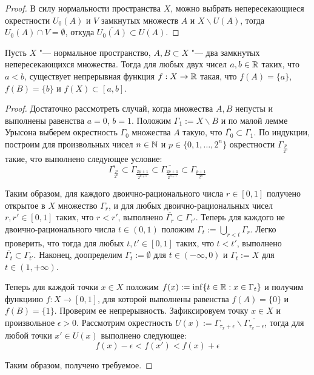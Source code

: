 \begin{proof}
    В силу нормальности пространства $X$, можно выбрать непересекающиеся окрестности $U_0(A)$ и $V$ замкнутых множеств $A$ и $X \backslash U(A)$, тогда $U_0(A) \cap V = \emptyset$, откуда $\overline{U_0(A)} \subset U(A)$.
\end{proof}

\begin{proposition}
    Пусть $X$ "--- нормальное пространство, $A, B \subset X$ "--- два замкнутых  непересекающихся множества. Тогда для любых двух чисел $a, b \in \mathbb{R}$ таких, что $a < b$, существует непрерывная функция $f: X \to \mathbb{R}$ такая, что $f(A) = \{a\}$, $f(B) = \{b\}$ и $f(X) \subset [a, b]$.
\end{proposition}

\begin{proof}
    Достаточно рассмотреть случай, когда множества $A, B$ непусты и выполнены равенства $a = 0$, $b = 1$. Положим $\Gamma_1 :=  X \backslash B$ и по малой лемме Урысона выберем окрестность $\Gamma_0$ множества $A$ такую, что $\overline{\Gamma_0} \subset \Gamma_1$. По индукции, построим для произвольных чисел $n \in \mathbb{N}$ и $p \in \{0, 1, \dotsc, 2^n\}$ окрестности $\Gamma_{\frac{p}{2^n}}$ такие, что выполнено следующее условие:
    \[\overline{\Gamma_{\frac{p}{2^n}}} \subset \Gamma_{\frac{2p+1}{2^{n+1}}}\subset \overline{\Gamma_{\frac{2p+1}{2^{n+1}}}}\subset \Gamma_{\frac{p+1}{2^n}}\]

    Таким образом, для каждого двоично-рационального числа $r \in [0, 1]$ получено открытое в $X$ множество $\Gamma_r$, и для любых двоично-рациональных чисел $r, r' \in [0, 1]$ таких, что $r < r'$, выполнено $\overline{\Gamma_r} \subset \Gamma_{r'}$. Теперь для каждого не двоично-рационального числа $t \in (0, 1)$ положим $\Gamma_t := \bigcup_{r<t}\Gamma_r$. Легко проверить, что тогда для любых $t, t' \in [0, 1]$ таких, что $t < t'$, выполнено $\overline{\Gamma_t} \subset \Gamma_{t'}$. Наконец, доопределим $\Gamma_t := \emptyset$ для $t \in (-\infty, 0)$ и $\Gamma_t := X$ для $t \in (1, +\infty)$.
    
    Теперь для каждой точки $x \in X$ положим $f(x) := \inf\{t \in \mathbb{R}: x \in \Gamma_t\}$ и получим функциию $f: X \to [0, 1]$, для которой выполнены равенства $f(A) = \{0\}$ и $f(B) = \{1\}$. Проверим ее непрерывность. Зафиксировуем точку $x \in X$ и произвольное $\epsilon > 0$. Рассмотрим окрестность $U(x) := \Gamma_{\tau_x + \epsilon}\backslash \overline{\Gamma_{\tau_x - \epsilon}}$, тогда для любой точки $x'\in U(x)$ выполнено следующее:
    \[f(x) - \epsilon< f(x') <f(x) +\epsilon\]

    Таким образом, получено требуемое.
\end{proof}


